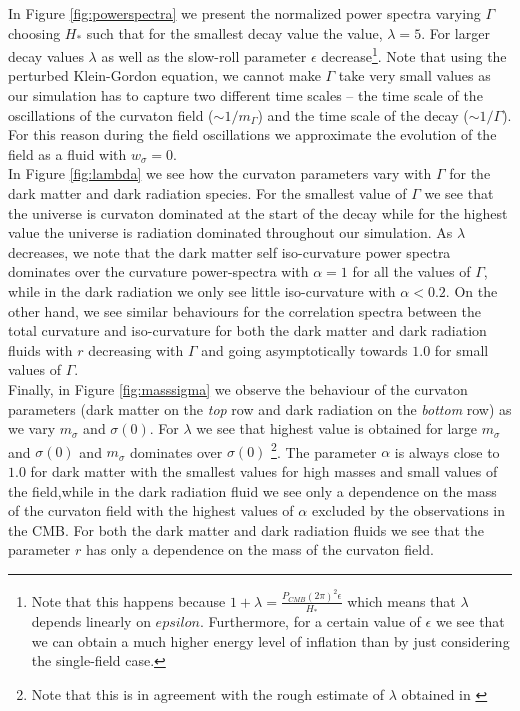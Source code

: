 \documentclass[11pt]{article}
\begin{document}
\indent In Figure \ref{fig:powerspectra} we present the normalized power spectra varying $\Gamma$ choosing $H_*$ such that for the smallest decay value  the value, $\lambda = 5$. For larger decay values $\lambda$ as well as the slow-roll parameter $\epsilon$ decrease\footnote{Note that this happens because $1 + \lambda = \frac{P_{CMB}(2\pi)^2 \epsilon}{H_*}$ which means that $\lambda$ depends linearly on $epsilon$. Furthermore, for a certain value of $\epsilon$ we see that we can obtain a much higher energy level of inflation than by just considering the single-field case.}. Note that using the perturbed Klein-Gordon equation, we cannot make $\Gamma$ take very small values as our simulation has to capture two different time scales -- the time scale of the oscillations of the curvaton field ($\sim 1/m_{\Gamma}$) and the time scale of the decay ($\sim 1/\Gamma$). For this reason during the field oscillations we approximate the evolution of the field as a fluid with $w_\sigma = 0$. \\
\indent In Figure \ref{fig:lambda} we see how the curvaton parameters vary with $\Gamma$ for the dark matter and dark radiation species. For the smallest value of $\Gamma$ we see that the universe is curvaton dominated at the start of the decay while for the highest value the universe is radiation dominated throughout our simulation. As $\lambda$ decreases, we note that the dark matter self iso-curvature power spectra dominates over the curvature power-spectra with $\alpha = 1$ for all the values of $\Gamma$, while in the dark radiation we only see little iso-curvature with $\alpha < 0.2$. On the other hand, we see similar behaviours for the correlation  spectra  between the total curvature and iso-curvature for both the dark matter and dark radiation fluids with $r$ decreasing with $\Gamma$ and going asymptotically towards $1.0$ for small values of $\Gamma$. \\
\indent Finally, in Figure \ref{fig:masssigma} we observe the behaviour of the curvaton parameters (dark matter on the \textit{top} row and dark radiation on the \textit{bottom} row) as we vary $m_{\sigma}$ and $\sigma(0)$. For $\lambda$ we see that highest value is obtained for large $m_{\sigma}$ and $\sigma(0)$ and $m_{\sigma}$ dominates over $\sigma(0)$  \footnote{Note that this is in agreement with the rough estimate of $\lambda$ obtained in \cite{} }. The parameter $\alpha$ is always close to $1.0$ for dark matter with the smallest values for high masses and small values of the field,while in the dark radiation fluid we see only a dependence on  the mass of the curvaton field with the highest values of $\alpha$ excluded by the observations in the CMB. For both the dark matter and dark radiation fluids we see that the parameter $r$ has only a dependence on the mass of the curvaton field.
\end{document}

